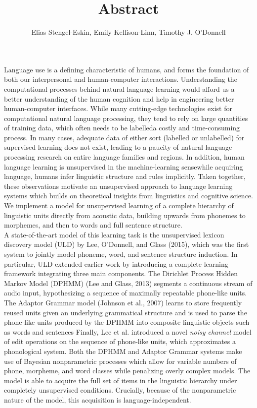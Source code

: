 \documentclass[12pt,letterpaper]{article}
\title{\vspace{-1.5cm} Abstract}
\author{Elias Stengel-Eskin, Emily Kellison-Linn, Timothy J. O'Donnell}
\begin{document}
\maketitle
Language use is a defining characteristic of humans, and forms the foundation of both our interpersonal and human-computer interactions.  Understanding the computational processes behind natural language learning would afford us a better understanding of the human cognition and help in engineering better human-computer interfaces. While many cutting-edge technologies exist for computational natural language processing, they tend to rely on large quantities of training data, which often needs to be labelled\textemdash a costly and time-consuming process. In many cases, adequate data of either sort (labelled or unlabelled) for supervised learning does not exist, leading to a paucity of natural language processing research on entire language families and regions. In addition, human language learning is unsupervised in the machine-learning sense\textemdash while acquiring language, humans infer linguistic structure and rules implicitly. Taken together, these observations motivate an unsupervised approach to  language learning systems which builds on theoretical insights from linguistics and cognitive science. We implement a model for unsupervised learning of a complete hierarchy of linguistic units directly from acoustic data, building upwards from phonemes to morphemes, and then to words and full sentence structure. \\

A state-of-the-art model of this learning task is the unsupervised lexicon discovery model (ULD) by Lee, O'Donnell, and Glass (2015), which was the first system to jointly model phoneme, word, and sentence structure induction. In particular, ULD extended earlier work by introducing a complete learning framework integrating three main components. The Dirichlet Process Hidden Markov Model (DPHMM) (Lee and Glass, 2013) segments a continuous stream of audio input, hypothesizing a sequence of maximally repeatable phone-like units. The Adaptor Grammar model (Johnson et al., 2007) learns to store frequently reused units given an underlying grammatical structure and is used to parse the phone-like units produced by the DPHMM into composite linguistic objects such as words and sentences Finally, Lee et al. introduced a novel \textit{noisy channel} model of edit operations on the sequence of phone-like units, which approximates a phonological system. Both the DPHMM and Adaptor Grammar systems make use of Bayesian nonparametric processes which allow for variable numbers of phone, morpheme, and word classes while penalizing overly complex models. The model is able to acquire the full set of items in the linguistic hierarchy under completely unsupervised conditions. Crucially, because of the nonparametric nature of the model, this acquisition is language-independent. \\
\end{document}
